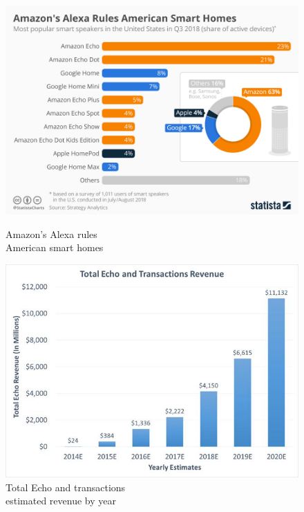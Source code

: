 \documentclass{article}
\begin{document}
\begin{figure}[H]
\centering
\begin{minipage}{.5\textwidth}
  \centering
  \includegraphics[width=0.97\linewidth]{img/amazonrules.jpg}
  \caption[Amazon's Alexa rules American smart homes]
    {Amazon's Alexa rules \\ American smart homes\endtabular}
  \label{fig:amazonrules}
\end{minipage}%
\begin{minipage}{.5\textwidth}
  \centering
  \includegraphics[width=0.97\linewidth]{img/alexastats.jpg}
  \caption[Total Echo and transactions estimated revenue by year]
  {Total Echo and transactions \\ estimated revenue by year\endtabular}
  \label{fig:alexastats}
\end{minipage}
\end{figure}
\end{document}
